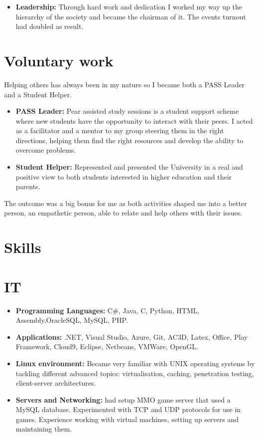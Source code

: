 \documentclass[12pt,a4paper]{res}
\begin{document}
\begin{resume}
\begin{itemize}
      \item {\bf Leadership:} Through hard work and dedication I worked my way up the hierarchy of the society and became the chairman of it. The events turnout had doubled as result.
     \end{itemize}
\newpage
\section{\large\bf Voluntary work}
\vspace{2mm}
Helping others has always been in my nature so I became both a PASS Leader and a Student Helper.
      \begin{itemize}
      \item {\bf PASS Leader:} Pear assisted study sessions is a student support scheme where new students have the opportunity to interact with their peers. I acted as a facilitator and a mentor to my group steering them in the right directions, helping them find the right resources and develop the ability to overcome problems.
      \item {\bf Student Helper:} Represented and presented the University in a real
    and positive view to both students interested in higher education and their parents. 
      \end{itemize}
\vspace{-3mm}
    The outcome was a big bonus for me as both activities shaped me into a better person, an empathetic person, able to relate and
    help others with their issues.
    \vspace{-3mm}

\section{\large\bf Skills}
\vspace{2mm}
\section{IT}
\vspace{-1mm}
  \begin{itemize}

  \item[] {\bf Programming Languages:} C\#, Java, C, Python, HTML, Assembly,OracleSQL, MySQL, PHP.
  \item[] {\bf Applications:} .NET, Visual Studio, Azure, Git, AC3D, Latex, Office, Play Framework, Cloud9, Eclipse, Netbeans, VMWare, OpenGL.
  \item[] {\bf Linux environment:} Became very familiar with UNIX operating systems by tackling different advanced topics: virtualisation, caching, penetration testing, client-server architectures.
  \item[] {\bf Servers and Networking:} had setup MMO game server that used a MySQL database. Experimented with TCP and UDP protocols for use in games. Experience working with virtual machines, setting up servers and maintaining them.
  \end{itemize}
\vspace{-3mm}


\end{resume}
\end{document}
